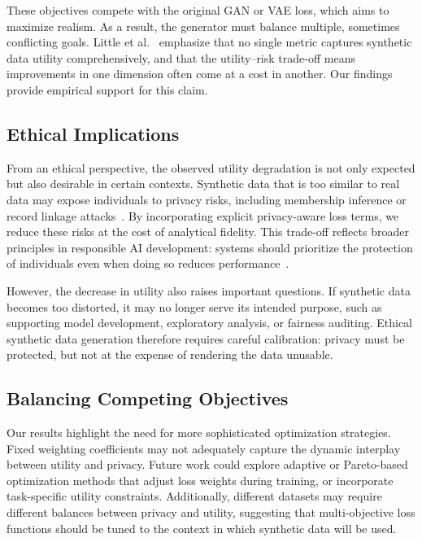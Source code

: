 \documentclass[11pt]{article}
\begin{document}
These objectives compete with the original GAN or VAE loss, which aims to maximize realism. As a result, the generator must balance multiple, sometimes conflicting goals. Little et al.~\cite{little2025synthetic} emphasize that no single metric captures synthetic data utility comprehensively, and that the utility--risk trade-off means improvements in one dimension often come at a cost in another. Our findings provide empirical support for this claim.

\subsection{Ethical Implications}

From an ethical perspective, the observed utility degradation is not only expected but also desirable in certain contexts. Synthetic data that is too similar to real data may expose individuals to privacy risks, including membership inference or record linkage attacks~\cite{stadler2022synthetic}. By incorporating explicit privacy-aware loss terms, we reduce these risks at the cost of analytical fidelity. This trade-off reflects broader principles in responsible AI development: systems should prioritize the protection of individuals even when doing so reduces performance~\cite{leslie2020ethics, floridi2016data}.

However, the decrease in utility also raises important questions. If synthetic data becomes too distorted, it may no longer serve its intended purpose, such as supporting model development, exploratory analysis, or fairness auditing. Ethical synthetic data generation therefore requires careful calibration: privacy must be protected, but not at the expense of rendering the data unusable.

\subsection{Balancing Competing Objectives}

Our results highlight the need for more sophisticated optimization strategies. Fixed weighting coefficients may not adequately capture the dynamic interplay between utility and privacy. Future work could explore adaptive or Pareto-based optimization methods that adjust loss weights during training, or incorporate task-specific utility constraints. Additionally, different datasets may require different balances between privacy and utility, suggesting that multi-objective loss functions should be tuned to the context in which synthetic data will be used.
\end{document}
